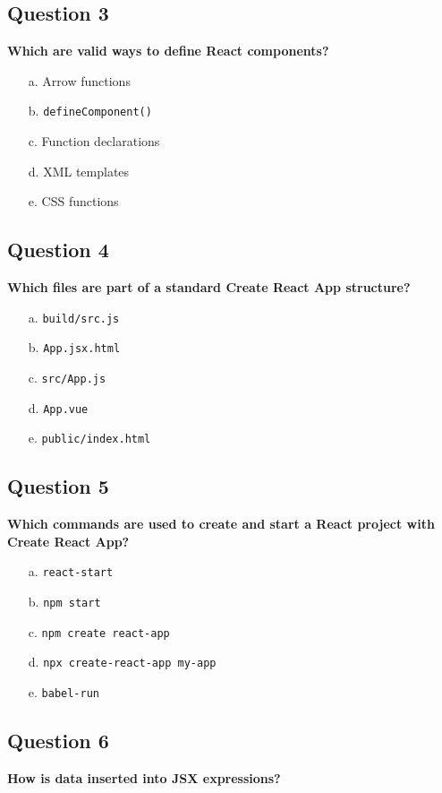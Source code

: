 \documentclass{article}
\begin{document}
\subsection*{Question 3}
\textbf{Which are valid ways to define React components?}

\begin{itemize}
  \item[a.] Arrow functions
  \item[b.] \texttt{defineComponent()}
  \item[c.] Function declarations
  \item[d.] XML templates
  \item[e.] CSS functions
\end{itemize}

\subsection*{Question 4}
\textbf{Which files are part of a standard Create React App structure?}

\begin{itemize}
  \item[a.] \texttt{build/src.js}
  \item[b.] \texttt{App.jsx.html}
  \item[c.] \texttt{src/App.js}
  \item[d.] \texttt{App.vue}
  \item[e.] \texttt{public/index.html}
\end{itemize}

\subsection*{Question 5}
\textbf{Which commands are used to create and start a React project with Create React App?}

\begin{itemize}
  \item[a.] \texttt{react-start}
  \item[b.] \texttt{npm start}
  \item[c.] \texttt{npm create react-app}
  \item[d.] \texttt{npx create-react-app my-app}
  \item[e.] \texttt{babel-run}
\end{itemize}

\subsection*{Question 6}
\textbf{How is data inserted into JSX expressions?}
\end{document}

